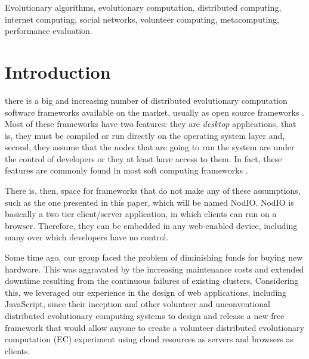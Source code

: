 \documentclass[journal,onecolumn]{IEEEtran}
\begin{document}
\begin{IEEEkeywords}
Evolutionary algorithms, evolutionary computation, distributed computing, internet computing,
social networks, volunteer computing, metacomputing, performance evaluation.
\end{IEEEkeywords}

\section{Introduction}

 there is a big and increasing number of
distributed evolutionary computation software frameworks available on
the market, usually as open source frameworks \cite{Parejo12Survey}. 
Most of these frameworks have 
two features: they are {\em desktop} applications, that is, they must
be compiled or run directly on the operating system layer and, second,
they assume that the nodes that are going to run the system are under
the control of developers or they at least have access to them. In
fact, these features are commonly found in most soft computing
frameworks \cite{7094263}. 

There is, then, space for frameworks that do not make any of these
assumptions, such as the one presented in this paper, which will be
 named {\sf NodIO}. {\sf NodIO} is basically
a two tier client/server 
application, in which clients can run on a browser. 
Therefore, they can be embedded in any web-enabled device, including many over which 
developers have no control.

Some time ago, our group faced the problem of diminishing funds for
buying new hardware. This was aggravated by the increasing maintenance costs and
extended downtime resulting from the continuous failures of existing
clusters.
Considering this, we leveraged our experience in the design of web
applications, including JavaScript, since their inception and other
volunteer and
unconventional distributed evolutionary computing systems to 
design and release a new free framework that would allow anyone to
create a volunteer distributed evolutionary computation (EC) experiment using cloud resources as
servers and browsers as clients.
\end{document}
